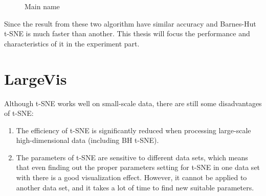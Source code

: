 \begin{figure}[H]
\centering  %
\caption{Main name}
\label{Fig.main}
\end{figure}

\noindent Since the result from these two algorithm have similar accuracy and Barnes-Hut t-SNE is much faster than another. This thesis will focus the performance and characteristics of it in the experiment part.


\chapter{LargeVis}

\noindent  Although t-SNE works well on small-scale data, there are still some disadvantages of t-SNE:


\begin{enumerate}[1)]
\item The efficiency of t-SNE is significantly reduced when processing large-scale high-dimensional data (including BH t-SNE).
\item The parameters of t-SNE are sensitive to different data sets, which means that even finding out the proper parameters setting for t-SNE in one data set with there is a good visualization effect. However, it cannot be applied to another data set, and it takes a lot of time to find new suitable parameters.
\end{enumerate}\\

